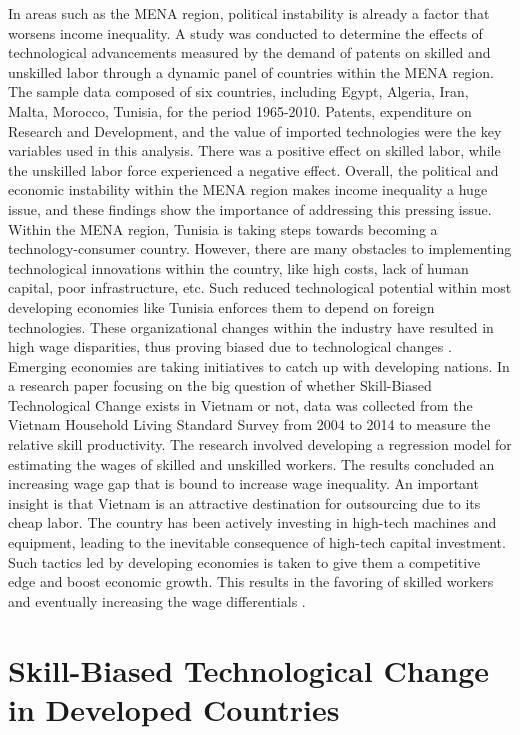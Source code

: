 In areas such as the MENA region, political instability is already a factor that worsens income inequality. A study was conducted to determine the effects of technological advancements measured by the demand of patents on skilled and unskilled labor through a dynamic panel of countries within the MENA region. The sample data composed of six countries, including Egypt, Algeria, Iran, Malta, Morocco, Tunisia, for the period 1965-2010. Patents, expenditure on Research and Development, and the value of imported technologies were the key variables used in this analysis. There was a positive effect on skilled labor, while the unskilled labor force experienced a negative effect. Overall, the political and economic instability within the MENA region makes income inequality a huge issue, and these findings show the importance of addressing this pressing issue. Within the MENA region, Tunisia is taking steps towards becoming a technology-consumer country. However, there are many obstacles to implementing technological innovations within the country, like high costs, lack of human capital, poor infrastructure, etc. Such reduced technological potential within most developing economies like Tunisia enforces them to depend on foreign technologies. These organizational changes within the industry have resulted in high wage disparities, thus proving biased due to technological changes \cite{aissaoui2015skill}. Emerging economies are taking initiatives to catch up with developing nations. In a research paper focusing on the big question of whether Skill-Biased Technological Change exists in Vietnam or not, data was collected from the Vietnam Household Living Standard Survey from 2004 to 2014 to measure the relative skill productivity. The research involved developing a regression model for estimating the wages of skilled and unskilled workers. The results concluded an increasing wage gap that is bound to increase wage inequality. An important insight is that Vietnam is an attractive destination for outsourcing due to its cheap labor. The country has been actively investing in high-tech machines and equipment, leading to the inevitable consequence of high-tech capital investment. Such tactics led by developing economies is taken to give them a competitive edge and boost economic growth. This results in the favoring of skilled workers and eventually increasing the wage differentials \cite{nguyen2018skill}.

\section{Skill-Biased Technological Change in Developed Countries}

